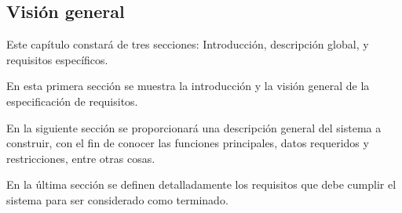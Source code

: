 \subsection{Visión general}
Este capítulo constará de tres secciones: Introducción, descripción global, y requisitos específicos. 

\bigskip

En esta primera sección se muestra la introducción y la visión general de la especificación de requisitos.

En la siguiente sección se proporcionará una descripción general del sistema a construir, con el fin de conocer las funciones principales, datos requeridos y restricciones, entre otras cosas. 

En la última sección se definen detalladamente los requisitos que debe cumplir el sistema para ser considerado como terminado.